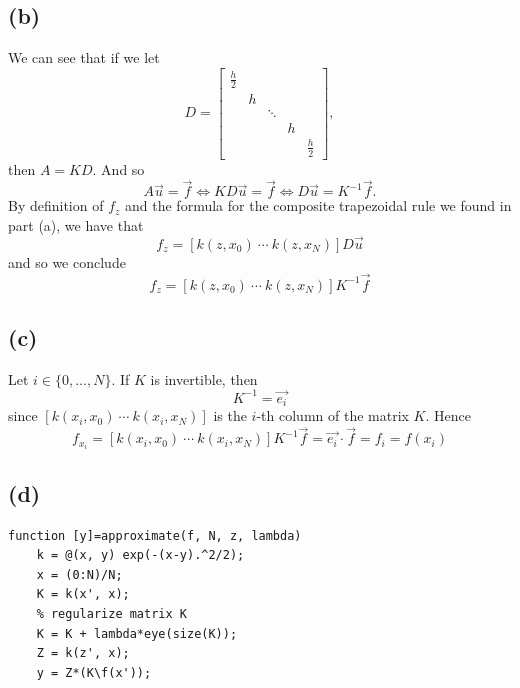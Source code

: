 \documentclass{article}
\begin{document}
\subsection*{(b)}
We can see that if we let
\begin{equation*}
	D =
	\begin{bmatrix}
		\frac{h}{2} & & & & \\
		 & h & & & \\
		 & & \ddots & & \\
		 & & & h & \\
		 & & & & \frac{h}{2}
	\end{bmatrix},
\end{equation*}
then $A = KD$. And so
\begin{equation*}
	A\vec{u} = \vec{f} \iff KD\vec{u} = \vec{f}
		\iff D\vec{u} = K^{-1}\vec{f}.
\end{equation*}
By definition of $f_z$ and the formula for the composite trapezoidal
rule we found in part (a), we have that
\begin{equation*}
	f_z = [k(z, x_0)~\cdots~k(z, x_N)]D\vec{u}
\end{equation*}
and so we conclude
\begin{equation*}
	f_z = [k(z, x_0)~\cdots~k(z, x_N)]K^{-1}\vec{f}
\end{equation*}

\subsection*{(c)}
Let $i \in \{0, \dots, N\}$. If $K$ is invertible, then
\begin{equation*}
	[k(x_i, x_0)~\cdots~k(x_i, x_N)]K^{-1} = \vec{e_i}
\end{equation*}
since $[k(x_i, x_0)~\cdots~k(x_i, x_N)]$ is the $i$-th column of
the matrix $K$.
Hence
\begin{equation*}
	f_{x_i} = [k(x_i, x_0)~\cdots~k(x_i, x_N)]K^{-1}\vec{f}
	= \vec{e_i}\cdot\vec{f} = f_i = f(x_i)
\end{equation*}

\subsection*{(d)}

\begin{Verbatim}[frame=single,
	label=\textsc{Matlab} code - approximate.m]
function [y]=approximate(f, N, z, lambda)
    k = @(x, y) exp(-(x-y).^2/2);
    x = (0:N)/N;
    K = k(x', x);
    % regularize matrix K
    K = K + lambda*eye(size(K));
    Z = k(z', x);
    y = Z*(K\f(x'));
\end{Verbatim}
\end{document}
